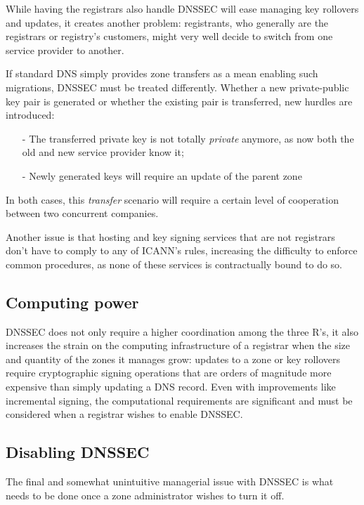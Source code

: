 \documentclass[a4paper,twocolumn]{scrartcl}
\begin{document}
While having the registrars also handle DNSSEC will ease managing key rollovers and updates, it creates another problem: registrants, who generally are the registrars or registry's customers, might very well decide to switch from one service provider to another.

If standard DNS simply provides zone transfers as a mean enabling such migrations, DNSSEC must be treated differently. Whether a new private-public key pair is generated or whether the existing pair is transferred, new hurdles are introduced:

\begin{itemize}
\item[-] The transferred private key is not totally \emph{private} anymore, as now both the old and new service provider know it;
\item[-] Newly generated keys will require an update of the parent zone
\end{itemize}

In both cases,  this \emph{transfer} scenario will require a certain level of cooperation between two concurrent companies.

Another issue is that hosting and key signing services that are not registrars don't have to comply to any of ICANN's rules, increasing the difficulty to enforce common procedures, as none of these services is contractually bound to do so.

\subsection{Computing power}
DNSSEC does not only require a higher coordination among the three R's, it also increases the strain on the computing infrastructure of a registrar when the size and quantity of the  zones it manages grow: updates to a zone or key rollovers require cryptographic signing operations that are orders of magnitude more expensive than simply updating a DNS record. Even with improvements like incremental signing, the computational requirements are significant and must be considered when a registrar wishes to enable DNSSEC.

\subsection{Disabling DNSSEC}
The final and somewhat unintuitive managerial issue with DNSSEC is what needs to be done once a zone administrator wishes to turn it off. 
\end{document}
